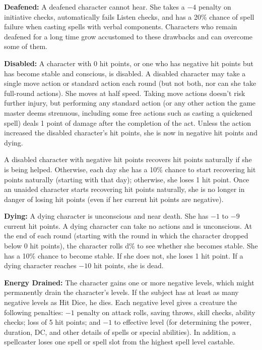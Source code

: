 \textbf{Deafened:} A deafened character cannot hear. She takes a $-4$ penalty on initiative checks, automatically fails Listen checks, and has a 20\% chance of spell failure when casting spells with verbal components. Characters who remain deafened for a long time grow accustomed to these drawbacks and can overcome some of them.

\textbf{Disabled:} A character with 0 hit points, or one who has negative hit points but has become stable and conscious, is disabled. A disabled character may take a single move action or standard action each round (but not both, nor can she take full-round actions). She moves at half speed. Taking move actions doesn't risk further injury, but performing any standard action (or any other action the game master deems strenuous, including some free actions such as casting a quickened spell) deals 1 point of damage after the completion of the act. Unless the action increased the disabled character's hit points, she is now in negative hit points and dying.

A disabled character with negative hit points recovers hit points naturally if she is being helped. Otherwise, each day she has a 10\% chance to start recovering hit points naturally (starting with that day); otherwise, she loses 1 hit point. Once an unaided character starts recovering hit points naturally, she is no longer in danger of losing hit points (even if her current hit points are negative).

\textbf{Dying:} A dying character is unconscious and near death. She has $-1$ to $-9$ current hit points. A dying character can take no actions and is unconscious. At the end of each round (starting with the round in which the character dropped below 0 hit points), the character rolls d\% to see whether she becomes stable. She has a 10\% chance to become stable. If she does not, she loses 1 hit point. If a dying character reaches $-10$ hit points, she is dead.

\textbf{Energy Drained:} The character gains one or more negative levels, which might permanently drain the character's levels. If the subject has at least as many negative levels as Hit Dice, he dies. Each negative level gives a creature the following penalties: $-1$ penalty on attack rolls, saving throws, skill checks, ability checks; loss of 5 hit points; and $-1$ to effective level (for determining the power, duration, DC, and other details of spells or special abilities). In addition, a spellcaster loses one spell or spell slot from the highest spell level castable.

